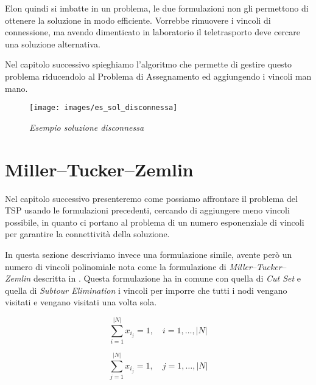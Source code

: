 Elon quindi si imbatte in un problema, le due formulazioni non gli permettono di ottenere la soluzione in modo efficiente. Vorrebbe rimuovere i vincoli di connessione, ma avendo dimenticato in laboratorio il teletrasporto deve cercare una soluzione alternativa.

Nel capitolo successivo spieghiamo l'algoritmo che permette di gestire questo problema riducendolo al Problema di Assegnamento ed aggiungendo i vincoli man mano.

\newpage

\begin{figure}[ht]
	\centering
	\texttt{[image: images/es\_sol\_disconnessa]}
	\caption{\textit{Esempio soluzione disconnessa}}
	\label{img:es_sol_disconnessa}
\end{figure}


\newpage
\section{Miller–Tucker–Zemlin}\label{mtz}
Nel capitolo successivo presenteremo come possiamo affrontare il problema del TSP usando le formulazioni precedenti, cercando di aggiungere meno vincoli possibile, in quanto ci portano al problema di un numero esponenziale di vincoli per garantire la connettività della soluzione. 

In questa sezione descriviamo invece una formulazione simile, avente però un numero di vincoli polinomiale nota come la formulazione di \textit{Miller–Tucker–Zemlin} descritta in \cite{mtz}. Questa formulazione ha in comune con quella di \textit{Cut Set} e quella di \textit{Subtour Elimination} i vincoli per imporre che tutti i nodi vengano visitati e vengano visitati una volta sola.

\[
\sum_{i = 1}^{|N|} x_{i_j} = 1, \quad  i = 1, \dots, |N| 
\]

\[
\sum_{j = 1}^{|N|} x_{i_j} = 1, \quad  j = 1, \dots, |N|
\]

